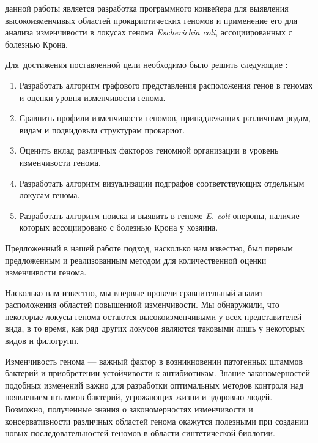 {\aim} данной работы является разработка программного конвейера для выявления высокоизменчивых областей прокариотических геномов и применение его для анализа изменчивости в локусах генома \textit{Escherichia coli}, ассоциированных с болезнью Крона.


Для~достижения поставленной цели необходимо было решить следующие {\tasks}:
\begin{enumerate}[beginpenalty=10000] 
  \item Разработать алгоритм графового представления расположения генов в геномах и оценки уровня изменчивости генома.
  \item Сравнить профили изменчивости геномов, принадлежащих различным родам, видам и подвидовым структурам прокариот.
  \item Оценить вклад различных факторов геномной организации в уровень изменчивости генома. 
  \item Разработать алгоритм визуализации подграфов соответствующих отдельным локусам генома.
  \item Разработать алгоритм поиска и выявить в геноме \textit{E. coli} опероны, наличие которых ассоциировано с болезнью Крона у хозяина.  
\end{enumerate}


{\novelty}
Предложенный в нашей работе подход, насколько нам известно, был первым предложенным и реализованным методом для количественной оценки изменчивости генома. 

Насколько нам известно, мы впервые провели сравнительный анализ расположения областей повышенной изменчивости. Мы обнаружили, что некоторые локусы генома остаются высокоизменчивыми у всех представителей вида, в то время, как ряд других локусов являются таковыми лишь у некоторых видов и филогрупп. 

{\influence} 

Изменчивость генома --- важный фактор в возникновении патогенных штаммов бактерий и приобретении устойчивости к антибиотикам. Знание закономерностей подобных изменений важно для разработки оптимальных методов контроля над появлением штаммов бактерий, угрожающих жизни и здоровью людей. Возможно, полученные знания о закономерностях изменчивости и консервативности различных областей генома окажутся полезными при создании новых последовательностей геномов в области синтетической биологии. 



